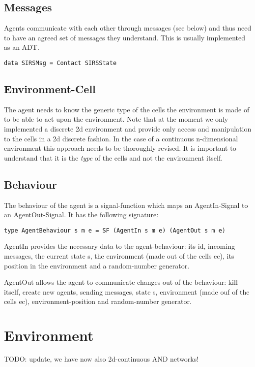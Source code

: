 \subsection{Messages}
Agents communicate with each other through messages (see below) and thus need to have an agreed set of messages they understand. This is usually implemented as an ADT.
\begin{lstlisting}[]
data SIRSMsg = Contact SIRSState
\end{lstlisting}

\subsection{Environment-Cell}
The agent needs to know the generic type of the cells the environment is made of to be able to act upon the environment. Note that at the moment we only implemented a discrete 2d environment and provide only access and manipulation to the cells in a 2d discrete fashion. In the case of a continuous n-dimensional environment this approach needs to be thoroughly revised. It is important to understand that it is the \textit{type} of the cells and not the environment itself.

\subsection{Behaviour}
The behaviour of the agent is a signal-function which maps an AgentIn-Signal to an AgentOut-Signal. It has the following signature: 
\begin{lstlisting}[]
type AgentBehaviour s m e = SF (AgentIn s m e) (AgentOut s m e)
\end{lstlisting}

AgentIn provides the necessary data to the agent-behaviour: its id, incoming messages, the current state s, the environment (made out of the cells ec), its position in the environment and a random-number generator. 

AgentOut allows the agent to communicate changes out of the behaviour: kill itself, create new agents, sending messages, state s, environment (made ouf of the cells ec), environment-position and random-number generator. 

\section{Environment}
TODO: update, we have now also 2d-continuous AND networks!

